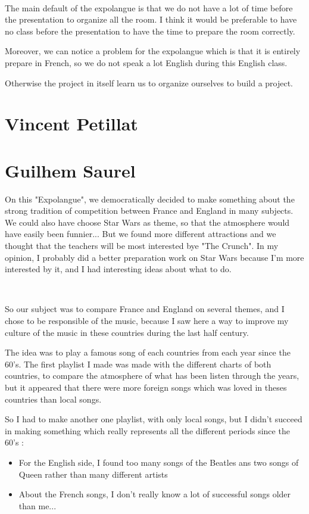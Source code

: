 \documentclass[11pt;a4paper]{report}
\begin{document}
~

The main default of the expolangue is that we do not have a lot of time before the presentation to organize all the room. I think it would be preferable to have no class before the presentation to have the time to prepare the room correctly.

Moreover, we can notice a problem for the expolangue which is that it is entirely prepare in French, so we do not speak a lot English during this English class.

Otherwise the project in itself learn us to organize ourselves to build a project.

\newpage
  \section{Vincent Petillat}
\newpage
  \section{Guilhem Saurel}
  
    On this "Expolangue", we democratically decided to make something about the strong tradition of competition between France and England in many subjects.
We could also have choose Star Wars as theme, so that the atmosphere would have easily been funnier... But we found more different attractions and we thought that the teachers will be most interested bye "The Crunch". In my opinion, I probably did a better preparation work on Star Wars because I'm more interested by it, and I had interesting ideas about what to do.

~

So our subject was to compare France and England on several themes, and I chose to be responsible of the music, because I saw here a way to improve my culture of the music in these countries during the last half century.

The idea was to play a famous song of each countries from each year since the 60's. The first playlist I made was made with the different charts of both countries, to compare the atmosphere of what has been listen through the years, but it appeared that there were more foreign songs which was loved in theses countries than local songs.

So I had to make another one playlist, with only local songs, but I didn't succeed in making something which really represents all the different periods since the 60's : 
\begin{itemize}
    \item For the English side, I found too many songs of the Beatles ans two songs of Queen rather than many different artists
        \item About the French songs, I don't really know a lot of successful songs older than me...
        \end{itemize}
\end{document}
